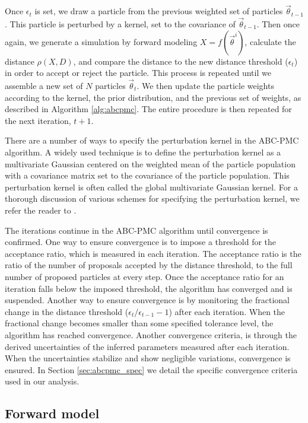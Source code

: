 \documentclass[fleqn,usenatbib]{mnras}
\newcommand{\pars}{\vec{\theta}}
\begin{document}
Once $\epsilon_t$ is set, we draw a particle from the previous 
weighted set of particles ${\pars}_{t-1}$. 
This particle is perturbed by a kernel, set to the covariance of ${\pars}_{t-1}$.
Then once again, we generate a simulation by forward modeling $X = f(\pars^i)$, 
calculate the distance $\rho(X, D)$, and compare the distance to the new distance 
threshold ($\epsilon_t$) in order to accept or reject the particle. This process is 
repeated until we assemble a new set of $N$ particles ${\pars}_t$. We then update the 
particle weights according to the kernel, the prior distribution, and the 
previous set of weights, as described in Algorithm \ref{alg:abcpmc}. The 
entire procedure is then repeated for the next iteration, $t+1$.

There are a number of ways to specify the perturbation kernel in the ABC-PMC algorithm. 
A widely used technique is to define the perturbation kernel as a multivariate Gaussian 
centered on the weighted mean of the particle population with a covariance matrix set to 
the covariance of the particle population. This perturbation kernel is often called the 
global multivariate Gaussian kernel. For a thorough discussion of various schemes for 
specifying the perturbation kernel, we refer the reader to \citealt{optimalkernel}. 

The iterations continue in the ABC-PMC algorithm until convergence is confirmed. 
One way to ensure convergence is to impose a threshold for the acceptance ratio, 
which is measured in each iteration. The acceptance ratio is the ratio of the number 
of proposals accepted by the distance threshold, to the full number 
of proposed particles at every step. Once the acceptance ratio for 
an iteration falls below the imposed threshold, the algorithm has converged and is
suspended. Another way to ensure convergence is by monitoring the fractional change in 
the distance threshold ($\epsilon_t/\epsilon_{t-1} - 1$)
after each iteration. When the fractional change becomes smaller than some 
specified tolerance level, the algorithm has reached convergence. Another 
convergence criteria, is through the derived uncertainties of the inferred
parameters measured after each iteration. When the uncertainties stabilize 
and show negligible variations, convergence is ensured. In Section \ref{sec:abcpmc_spec} 
we detail the specific convergence criteria used in our analysis. 

\subsection{Forward model}\label{sec:forwardmodel}
\end{document}
